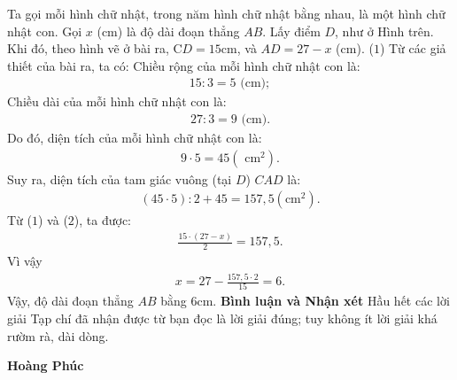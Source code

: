 \begin{multicols}{2}
\begin{figure}[H]
		\vspace*{-10pt}
	\end{figure}
	Ta gọi mỗi hình chữ nhật, trong năm hình chữ nhật bằng nhau, là một hình chữ nhật con.
	\vskip 0.05cm
	Gọi $x$ (cm) là độ dài đoạn thẳng $AB$.
	\vskip 0.05cm
	Lấy điểm $D$, như ở Hình trên.
	\vskip 0.05cm
	Khi đó, theo hình vẽ ở bài ra, C$D = 15$cm, và $AD = 27 - x$ (cm). \hfill   ($1$)
	\vskip 0.05cm
	Từ các giả thiết của bài ra, ta có:
	\vskip 0.05cm
	Chiều rộng của mỗi hình chữ nhật con là:
	\begin{align*}
		15 : 3 = 5\text{ (cm)};
	\end{align*}
	Chiều dài của mỗi hình chữ nhật con là:
	\begin{align*}
		27 : 3 = 9 \text{ (cm).}
	\end{align*}
	Do đó, diện tích của mỗi hình chữ nhật con là:
	\begin{align*}
		9 \cdot 5 = 45 (\text{ cm}^2).
	\end{align*}
	Suy ra, diện tích của tam giác vuông (tại $D$) $CAD$ là:
	\begin{align*}
		(45\cdot 5): 2 + 45 = 157,5 (\text{cm}^2). \tag{$2$}
	\end{align*}
	Từ ($1$) và ($2$), ta được:
	\begin{align*}
		\frac{15\cdot(27-x)}{2} = 157,5.
	\end{align*}
	Vì vậy
	\begin{align*}
		x = 27 - \frac{{157,5 \cdot 2}}{{15}} = 6.
	\end{align*}
	Vậy, độ dài đoạn thẳng $AB$ bằng $6$cm.
	\vskip 0.05cm
	\textbf{\color{thachthuctoanhoc}Bình luận và Nhận xét}
	\vskip 0.05cm	
	Hầu hết các lời giải Tạp chí đã nhận được từ bạn đọc là lời giải đúng; tuy không ít lời giải khá rườm rà, dài dòng.
	\begin{flushright}
		\textbf{\color{thachthuctoanhoc}Hoàng Phúc}
	\end{flushright}

\end{multicols}
